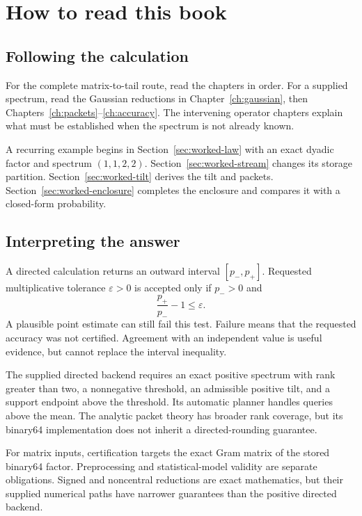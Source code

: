 \chapter*{How to read this book}
\section*{Following the calculation}
For the complete matrix-to-tail route, read the chapters in order. For a supplied spectrum, read the Gaussian reductions in Chapter~\ref{ch:gaussian}, then Chapters~\ref{ch:packets}--\ref{ch:accuracy}. The intervening operator chapters explain what must be established when the spectrum is not already known.

A recurring example begins in Section~\ref{sec:worked-law} with an exact dyadic factor and spectrum $(1,1,2,2)$. Section~\ref{sec:worked-stream} changes its storage partition. Section~\ref{sec:worked-tilt} derives the tilt and packets. Section~\ref{sec:worked-enclosure} completes the enclosure and compares it with a closed-form probability.

\section*{Interpreting the answer}
A directed calculation returns an outward interval $[p_-,p_+]$. Requested multiplicative tolerance $\varepsilon>0$ is accepted only if $p_->0$ and
\[
\frac{p_+}{p_-}-1\le\varepsilon.
\]
A plausible point estimate can still fail this test. Failure means that the requested accuracy was not certified. Agreement with an independent value is useful evidence, but cannot replace the interval inequality.

The supplied directed backend requires an exact positive spectrum with rank greater than two, a nonnegative threshold, an admissible positive tilt, and a support endpoint above the threshold. Its automatic planner handles queries above the mean. The analytic packet theory has broader rank coverage, but its binary64 implementation does not inherit a directed-rounding guarantee.

For matrix inputs, certification targets the exact Gram matrix of the stored binary64 factor. Preprocessing and statistical-model validity are separate obligations. Signed and noncentral reductions are exact mathematics, but their supplied numerical paths have narrower guarantees than the positive directed backend.

